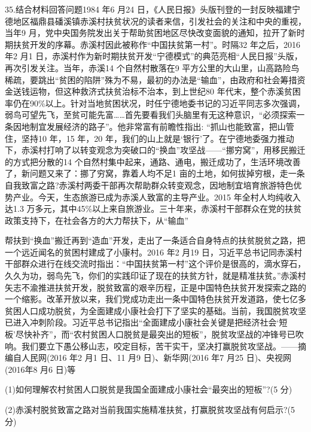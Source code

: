 \documentclass[UTF8,11pt]{ctexart}
\begin{document}
35.结合材料回答问题1984 年6 月24 日，《人民日报》头版刊登的一封反映福建宁德地区福鼎县磻溪镇赤溪村扶贫状况的读者来信，引发社会的关注和中央的重视，当年9 月，党中央国务院发出关于帮助贫困地区尽快改变面貌的通知，拉开了新时期扶贫开发的序幕。赤溪村因此被称作“中国扶贫第一村”。时隔32 年之后，2016 年2 月1 日，赤溪村作为新时期扶贫开发“宁德模式”的典范亮相“人民日报”头版，再次引发关注。当年，赤溪14 个自然村散落在9 平方公里的大山里，山高路险鸟稀疏，要跳出“贫困的陷阱”殊为不易，最初的办法是“输血”，由政府和社会筹措资金送钱运物，但这种救济式扶贫治标不治本，到上世纪80 年代末，整个赤溪贫困率仍在90\%以上。针对当地贫困状况，时任宁德地委书记的习近平同志多次强调，弱鸟可望先飞，至贫可能先富……首先要看我们头脑里有无这种意识，“必须探索一条因地制宜发展经济的路子”。他非常富有前瞻性指出: “抓山也能致富，把山管住，坚持10 年，15 年，20 年，我们的山上就是‘银行’了。在宁德地委强力推动下，赤溪村打响了以转变观念为突破口的“换血”攻坚战——“挪穷窝”，用移民搬迁的方式把分散的14 个自然村集中起来，通路、通电，搬迁成功了，生活环境改善了，新问题又来了：挪了穷窝，靠着人均不足1 亩的土地，如何拔掉穷根，走一条自我致富之路?赤溪村两委干部再次帮助群众转变观念，因地制宜培育旅游特色优势产业。今天，生态旅游已成为赤溪人致富的主导产业。2015 年全村人均纯收入达1.3 万多元，其中45\%以上来自旅游业。三十年来，赤溪村干部群众在党的扶贫政策支持下，在社会各方的大力帮扶下，从“输血”


帮扶到“换血”搬迁再到“造血”开发，走出了一条适合自身特点的扶贫脱贫之路，把一个远近闻名的贫困村建成了小康村。2016 年2 月19 日，习近平总书记同赤溪村干部群众进行在线交流时指出：“中国扶贫第一村”这个评价是很高的，滴水穿石，久久为功，弱鸟先飞，你们的实践印证了现在的扶贫方针，就是精准扶贫。”赤溪村矢志不渝推进扶贫开发，脱贫致富的艰辛历程，正是中国特色扶贫开发探索之路的一个缩影。改革开放以来，我们党成功走出一条中国特色扶贫开发道路，使七亿多贫困人口成功脱贫，为全面建成小康社会打下了坚实的基础。当前，我国脱贫攻坚已进入冲刺阶段。习近平总书记指出“全面建成小康社会关键是把经济社会‘短板’尽快补齐”，而“农村贫困人口脱贫是最突出的短板”，脱贫攻坚战的冲锋号已吹响。我们要立下愚公移山志，咬定目标，苦干实干，坚决打赢脱贫攻坚战。——摘编自人民网(2016 年2 月1 日、11 月9 日)、新华网(2016 年7 月25 日)、央视网(2016年8 月6 日)等


(1)如何理解农村贫困人口脱贫是我国全面建成小康社会“最突出的短板”?(5 分)


(2)赤溪村脱贫致富之路对当前我国实施精准扶贫，打赢脱贫攻坚战有何启示?(5 分)
\end{document}
